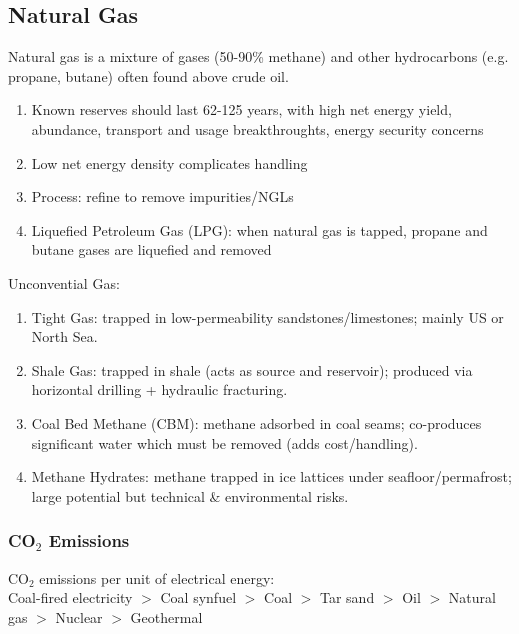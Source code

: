 \documentclass[12pt, a4paper]{article}
\begin{document}
\begin{multicols*}{3}
\colbreak
\subsection{Natural Gas}
Natural gas is a mixture of gases (50-90\% methane) and other hydrocarbons (e.g. propane, butane) often found above crude oil.
\begin{enumerate}[\roman*.]
  \item Known reserves should last 62-125 years, with high net energy yield, abundance, transport and usage breakthroughts, energy security concerns
  \item Low net energy density complicates handling
  \item Process: refine to remove impurities/NGLs
  \item Liquefied Petroleum Gas (LPG): when natural gas is tapped, propane and butane gases are liquefied and removed
\end{enumerate}

Unconvential Gas:
\begin{enumerate}[\roman*.]
  \item Tight Gas: trapped in low-permeability sandstones/limestones; mainly US or North Sea.
  \item Shale Gas: trapped in shale (acts as source and reservoir); produced via horizontal drilling + hydraulic fracturing.
  \item Coal Bed Methane (CBM): methane adsorbed in coal seams; co-produces significant water which must be removed (adds cost/handling).
  \item Methane Hydrates: methane trapped in ice lattices under seafloor/permafrost; large potential but technical \& environmental risks.
\end{enumerate}

\subsubsection{CO$_2$ Emissions}
CO$_2$ emissions per unit of electrical energy:\\Coal-fired electricity $>$ Coal synfuel $>$ Coal $>$ Tar sand $>$ Oil $>$ Natural gas $>$ Nuclear $>$ Geothermal
\colbreak


\end{multicols*}
\end{document}
